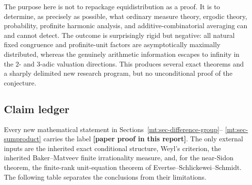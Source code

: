 \documentclass[11pt,oneside]{article}
\theoremstyle{definition}
\theoremstyle{remark}
\newcommand{\statusnew}{\textcolor{newgreen}{\textbf{[paper proof in this report]}}}
\begin{document}
The purpose here is not to repackage equidistribution as a proof.  It is to determine, as
precisely as possible, what ordinary measure theory, ergodic theory, probability, profinite
harmonic analysis, and additive-combinatorial averaging can and cannot detect.  The outcome is
surprisingly rigid but negative: all natural fixed congruence and profinite-unit factors are asymptotically maximally distributed,
whereas the genuinely arithmetic information escapes to infinity in the $2$- and $3$-adic
valuation directions.  This produces several exact theorems and a sharply delimited new
research program, but no unconditional proof of the conjecture.

\subsection{Claim ledger}

Every new mathematical statement in Sections~\ref{mt:sec-difference-group}--
\ref{mt:sec-sumproduct} carries the label \statusnew.  The only external inputs are the
inherited exact conditional structure, Weyl's criterion, the inherited Baker--Matveev finite
irrationality measure, and, for the near-Sidon theorem, the finite-rank unit-equation theorem of
Evertse--Schlickewei--Schmidt.  The following table separates the conclusions from their
limitations.
\end{document}
